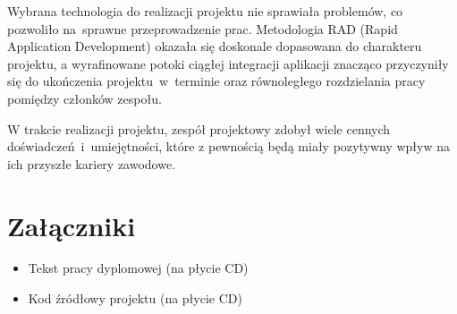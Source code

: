 Wybrana technologia do realizacji projektu nie sprawiała problemów, co pozwoliło na~sprawne przeprowadzenie prac.
Metodologia RAD (Rapid Application Development) okazała się doskonale dopasowana do charakteru projektu, a wyrafinowane potoki ciągłej integracji aplikacji znacząco przyczyniły się do ukończenia projektu~w~terminie oraz równoległego rozdzielania pracy pomiędzy członków zespołu.

W trakcie realizacji projektu, zespół projektowy zdobył wiele cennych doświadczeń~i~umiejętności, które z pewnością będą miały pozytywny wpływ na ich przyszłe kariery zawodowe.

\chapter*{Załączniki}
\begin{itemize}
    \item Tekst pracy dyplomowej (na płycie CD)
    \item Kod źródłowy projektu (na płycie CD)
\end{itemize}
